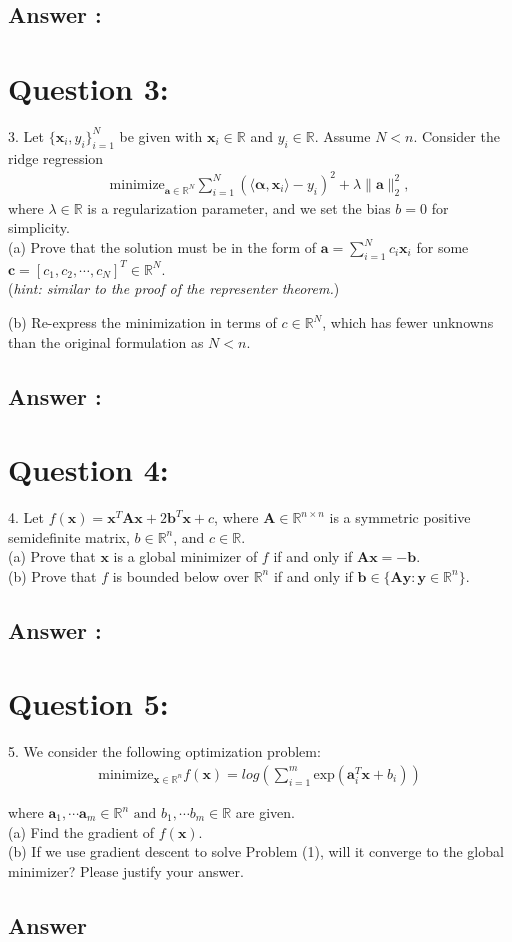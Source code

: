 \documentclass[a4paper,12pt]{article}
\newcommand{\R}{\mathbb{R}}
\begin{document}
\subsection*{Answer :}

\section*{Question 3:}
3. Let \(\{\bm{x}_i, y_i\}_{i = 1}^N\) be given with \(\bm{x}_i \in \R\) and \(y_i \in \R\). Assume \(N < n\). Consider the ridge regression
\begin{align*}
    \text{minimize}_{\bm{a}\in\R^N} \sum_{i = 1}^N (\langle \bm{\alpha}, \bm{x}_i\rangle - y_i)^2 + \lambda\|\bm{a}\|_2^2,
\end{align*}
where \(\lambda \in \R\) is a regularization parameter, and we set the bias \(b = 0\) for simplicity. \\

(a) Prove that the solution must be in the form of \(\bm{a} = \sum_{i = 1}^N c_i \bm{x}_i\) for some \(\bm{c} = [c_1, c_2, \cdots, c_N]^T \in \R^N\). \\
(\textit{hint: similar to the proof of the representer theorem.})

(b) Re-express the minimization in terms of \(c \in \R^N\), which has fewer unknowns than the original formulation as \(N < n\).


\subsection*{Answer :}
\section*{Question 4:}
4. Let \(f(\bm{x}) = \bm{x}^T\bm{A}\bm{x} + 2\bm{b}^T\bm{x} + c\), where \(\bm{A} \in \R^{n \times n}\) is a symmetric positive semidefinite matrix, \(b \in \R^n\), and \(c \in \R\). \\
(a) Prove that \(\bm{x}\) is a global minimizer of \(f\) if and only if \(\bm{A}\bm{x} = -\bm{b}\). \\
(b) Prove that \(f\) is bounded below over \(\R^n\) if and only if \(\bm{b} \in \{\bm{A}\bm{y}: \bm{y} \in \R^n\}\). \\
\subsection*{Answer :}

\section*{Question 5:}
5. We consider the following optimization problem:
\begin{align}
    \text{minimize}_{\bm{x} \in \R^n} f(\bm{x}) = log\left( \sum_{i = 1}^m \text{exp}(\bm{a}_i^T \bm{x} + b_i)\right)
\end{align}

where \(\bm{a}_1, \cdots \bm{a}_m \in \R^n \text{ and } b_1, \cdots b_m \in \R\) are given. \\

(a) Find the gradient of \(f(\bm{x})\). \\
(b) If we use gradient descent to solve Problem (1), will it converge to the global minimizer? Please justify your answer.


\subsection*{Answer}
\end{document}
